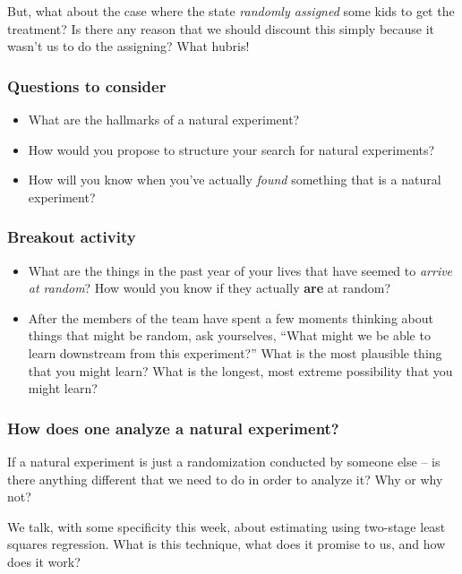 \documentclass[
]{article}
\providecommand{\tightlist}{%
  \setlength{\itemsep}{0pt}\setlength{\parskip}{0pt}}
\theoremstyle{definition}
\theoremstyle{definition}
\theoremstyle{definition}
\theoremstyle{definition}
\theoremstyle{remark}
\begin{document}
But, what about the case where the state \emph{randomly assigned} some kids to get the treatment? Is there any reason that we should discount this simply because it wasn't us to do the assigning? What hubris!

\subsubsection{Questions to consider}\label{questions-to-consider}

\begin{itemize}
\tightlist
\item
  What are the hallmarks of a natural experiment?
\item
  How would you propose to structure your search for natural experiments?
\item
  How will you know when you've actually \emph{found} something that is a natural experiment?
\end{itemize}

\subsubsection{Breakout activity}\label{breakout-activity}

\begin{itemize}
\tightlist
\item
  What are the things in the past year of your lives that have seemed to \emph{arrive at random}? How would you know if they actually \textbf{are} at random?
\item
  After the members of the team have spent a few moments thinking about things that might be random, ask yourselves, ``What might we be able to learn downstream from this experiment?'' What is the most plausible thing that you might learn? What is the longest, most extreme possibility that you might learn?
\end{itemize}

\subsubsection{How does one analyze a natural experiment?}\label{how-does-one-analyze-a-natural-experiment}

If a natural experiment is just a randomization conducted by someone else -- is there anything different that we need to do in order to analyze it? Why or why not?

We talk, with some specificity this week, about estimating using two-stage least squares regression. What is this technique, what does it promise to us, and how does it work?
\end{document}
